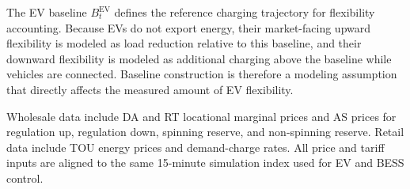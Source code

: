 \documentclass[final,5p,times]{elsarticle}
\newcommand{\EV}{\mathrm{EV}}
\begin{document}
The EV baseline $B_t^{\EV}$ defines the reference charging trajectory for flexibility accounting. Because EVs do not export energy, their market-facing upward flexibility is modeled as load reduction relative to this baseline, and their downward flexibility is modeled as additional charging above the baseline while vehicles are connected. Baseline construction is therefore a modeling assumption that directly affects the measured amount of EV flexibility.

Wholesale data include DA and RT locational marginal prices and AS prices for regulation up, regulation down, spinning reserve, and non-spinning reserve. Retail data include TOU energy prices and demand-charge rates. All price and tariff inputs are aligned to the same 15-minute simulation index used for EV and BESS control.
\end{document}
